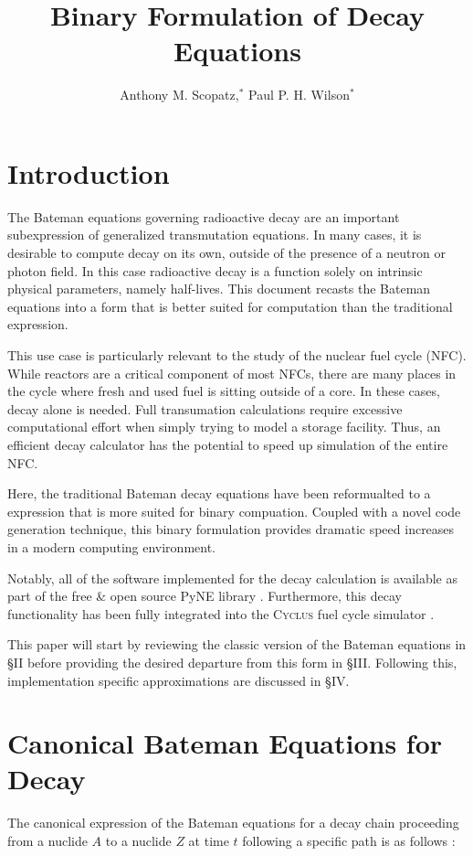 \documentclass{anstrans}
\title{Binary Formulation of Decay Equations}
\author{Anthony M. Scopatz,$^{*}$ Paul P. H. Wilson$^{*}$}
\institute{
$^{*}$The University of Wisconsin-Madison, 1500 Engineering Drive, Madison,
WI
}
\newcommand{\cyclus}{\textsc{Cyclus}\xspace}
\begin{document}
\section{Introduction}

The Bateman equations governing radioactive decay are an important 
subexpression of generalized transmutation equations. In many cases, it is 
desirable to compute decay on its own, outside of the presence of a neutron 
or photon field.  In this case radioactive decay is a function solely on 
intrinsic physical parameters, namely half-lives. This document recasts the 
Bateman equations into a form that is better suited for computation than the 
traditional expression.

This use case is particularly relevant to the study of the nuclear fuel 
cycle (NFC). While reactors are a critical component of most NFCs, there 
are many places in the cycle where fresh and used fuel is sitting outside 
of a core. In these cases, decay alone is needed. Full transumation 
calculations require excessive computational effort when simply trying to 
model a storage facility. Thus, an efficient decay calculator has the 
potential to speed up simulation of the entire NFC.

Here, the traditional Bateman decay equations have been reformualted to 
a expression that is more suited for binary compuation. Coupled with a 
novel code generation technique, this binary formulation provides 
dramatic speed increases in a modern computing environment. 

Notably, all of the software implemented for the decay calculation is 
available as part of the free \& open source PyNE library 
\cite{pyne2014,Bates2014}. Furthermore, this decay functionality has
been fully integrated into the \cyclus fuel cycle simulator
\cite{cyclus2015,cyclus_v1.2}.

This paper will start by reviewing the classic version of the Bateman 
equations in \S II before providing the desired departure from 
this form in \S III. Following this, implementation specific 
approximations are discussed in \S IV.

\section{Canonical Bateman Equations for Decay}
\label{canon}
The canonical expression of the Bateman equations for a decay chain 
proceeding from a nuclide $A$ to a nuclide $Z$ at time 
$t$ following a specific path is as follows \cite{Cetnar2006640}:
\end{document}
